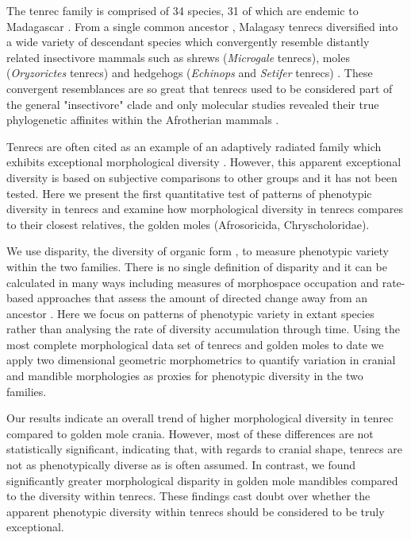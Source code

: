 \documentclass[12pt,a4paper]{article}
\begin{document}
The tenrec family is comprised of 34 species, 31 of which are endemic to Madagascar \citep{Olson2013}. From a single common ancestor \citep{Asher2006}, Malagasy tenrecs diversified into a wide variety of descendant species which convergently resemble distantly related insectivore mammals such as shrews (\textit{Microgale} tenrecs), moles (\textit{Oryzorictes} tenrecs) and hedgehogs (\textit{Echinops} and \textit{Setifer} tenrecs) \citep{Eisenberg1969}. These convergent resemblances are so great that tenrecs used to be considered part of the general "insectivore" clade and only molecular studies revealed their true phylogenetic affinites within the Afrotherian mammals \citep{Stanhope1998}.  

Tenrecs are often cited as an example of an adaptively radiated family which exhibits exceptional morphological diversity \citep{Soarimalala2011, Olson2003, Eisenberg1969}. However, this apparent exceptional diversity is based on subjective comparisons to other groups and it has not been tested. Here we present the first quantitative test of patterns of phenotypic diversity in tenrecs and examine how morphological diversity in tenrecs compares to their closest relatives, the golden moles (Afrosoricida, Chryscholoridae). 

We use disparity, the diversity of organic form \citep{Foote1997, Wills1994, Erwin2007}, to measure phenotypic variety within the two families. There is no single definition of disparity and it can be calculated in many ways including measures of morphospace occupation \citep[e.g.][]{Goswami2011, Brusatte2008} and rate-based approaches that assess the amount of directed change away from an ancestor \citep{OMeara2006, Price2013}. Here we focus on patterns of phenotypic variety in extant species rather than analysing the rate of diversity accumulation through time. 
Using the most complete morphological data set of tenrecs and golden moles to date we apply two dimensional geometric morphometrics \citep{Rohlf1993, Adams2013} to quantify variation in cranial and mandible morphologies as proxies for phenotypic diversity in the two families. 

Our results indicate an overall trend of higher morphological diversity in tenrec compared to golden mole crania. However, most of these differences are not statistically significant, indicating that, with regards to cranial shape, tenrecs are not as phenotypically diverse as is often assumed. In contrast, we found significantly greater morphological disparity in golden mole mandibles compared to the diversity within tenrecs.
These findings cast doubt over whether the apparent phenotypic diversity within tenrecs should be considered to be truly exceptional. 
\end{document}
